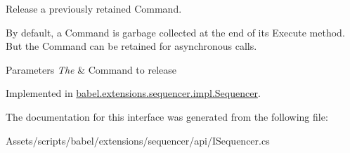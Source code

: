 Release a previously retained Command. 

By default, a Command is garbage collected at the end of its Execute method. But the Command can be retained for asynchronous calls.


\begin{DoxyParams}{Parameters}
{\em The} & Command to release \\
\hline
\end{DoxyParams}


Implemented in \hyperlink{classbabel_1_1extensions_1_1sequencer_1_1impl_1_1_sequencer_a0302109e4c69305f4387e35a18c35da3}{babel.\-extensions.\-sequencer.\-impl.\-Sequencer}.



The documentation for this interface was generated from the following file\-:\begin{DoxyCompactItemize}
\item 
Assets/scripts/babel/extensions/sequencer/api/I\-Sequencer.\-cs\end{DoxyCompactItemize}
